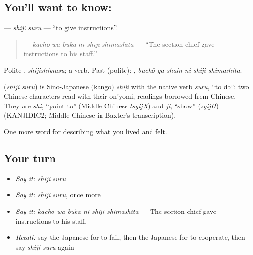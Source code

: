 \subsection*{You'll want to know: }
\textbf{} — \emph{shiji suru} — \textquotedblleft{}to give instructions\textquotedblright{}.

\begin{quote}
\textbf{  } — \emph{kachō wa buka ni shiji shimashita} — \textquotedblleft{}The section chief gave instructions to his staff.\textquotedblright{}
\end{quote}

Polite \textbf{}, \emph{shijishimasu}; a  verb. Past (polite): \textbf{  }, \emph{buchō ga shain ni shiji shimashita}.

\begin{cousinweb}
\textbf{} (\emph{shiji suru}) is Sino-Japanese (kango) \emph{shiji} with the native verb \emph{suru}, \textquotedblleft{}to do\textquotedblright{}: two Chinese characters read with their on'yomi, readings borrowed from Chinese. They are \emph{shi}, \textquotedblleft{}point to\textquotedblright{} (Middle Chinese \emph{tsyijX}) and \emph{ji}, \textquotedblleft{}show\textquotedblright{} (\emph{zyijH}) (KANJIDIC2; Middle Chinese in Baxter's transcription).
\end{cousinweb}

\begin{grammarlens}[title={What you've built}]
One more word for describing what you lived and felt.
\end{grammarlens}

\subsection*{Your turn}
\begin{itemize}
\raggedright
  \item \emph{Say it:} \emph{shiji suru}
  \item \emph{Say it:} \emph{shiji suru}, once more
  \item \emph{Say it:} \emph{kachō wa buka ni shiji shimashita} — The section chief gave instructions to his staff.
  \item \emph{Recall:} say the Japanese for to fail, then the Japanese for to cooperate, then say \emph{shiji suru} again
\end{itemize}

